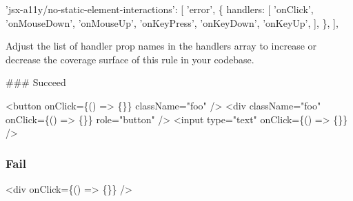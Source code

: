 \begin{DoxyCode}
'jsx-a11y/no-static-element-interactions': [
  'error',
  \{
    handlers: [
      'onClick',
      'onMouseDown',
      'onMouseUp',
      'onKeyPress',
      'onKeyDown',
      'onKeyUp',
    ],
  \},
],
\end{DoxyCode}


Adjust the list of handler prop names in the handlers array to increase or decrease the coverage surface of this rule in your codebase.

\#\#\# Succeed 
\begin{DoxyCode}
<button onClick=\{() => \{\}\} className="foo" />
<div className="foo" onClick=\{() => \{\}\} role="button" />
<input type="text" onClick=\{() => \{\}\} />
\end{DoxyCode}


\subsubsection*{Fail}


\begin{DoxyCode}
<div onClick=\{() => \{\}\} />
\end{DoxyCode}
 